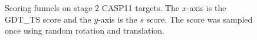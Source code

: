 \documentclass[letter,10pt]{article}
\begin{document}
\begin{figure}[H]
    \vspace{-2em}
    \centering
    \caption{Scoring funnels on stage 2 CASP11 targets. The
      $x$-axis is the GDT\_TS score and the $y$-axis is the $s$
      score. The score was sampled once using random rotation and
      translation.}
    \label{Fig:Satage2CASP11Funnels}
\end{figure}
\end{document}
